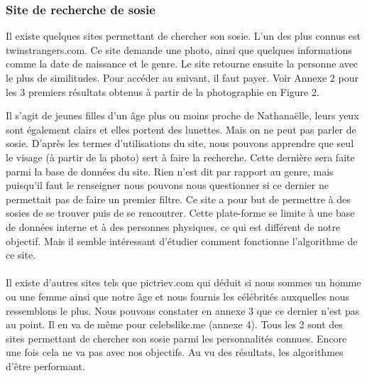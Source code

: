 \documentclass[a4paper,12pt]{article}
\begin{document}
\subsubsection{Site de recherche de sosie}
Il existe quelques sites permettant de chercher son sosie. L'un des plus connus est twinstrangers.com. Ce site demande une photo, ainsi que quelques informations comme la date de naissance et le genre. Le site retourne ensuite la personne avec le plus de similitudes. Pour accéder au suivant, il faut payer. 
Voir Annexe 2 pour les 3 premiers résultats obtenus à partir de la photographie en Figure 2. 
    
Il s'agit de jeunes filles d'un âge plus ou moins proche de Nathanaëlle, leurs yeux sont également clairs et elles portent des lunettes. Mais on ne peut pas parler de sosie. 
D'après les termes d'utilisations du site, nous pouvons apprendre que seul le visage (à partir de la photo) sert à faire la recherche. Cette dernière sera faite parmi la base de données du site. Rien n'est dit par rapport au genre, mais puisqu'il faut le renseigner nous pouvons nous questionner si ce dernier ne permettait pas de faire un premier filtre. Ce site a pour but de permettre à des sosies de se trouver puis de se rencontrer. Cette plate-forme se limite à une base de données interne et à des personnes physiques, ce qui est différent de notre objectif.
Mais il semble intéressant d'étudier comment fonctionne l'algorithme de ce site. 
\\\\
Il existe d'autres sites tels que pictriev.com qui déduit si nous sommes un homme ou une femme ainsi que notre âge et nous fournis les célébrités auxquelles nous ressemblons le plus. Nous pouvons constater en annexe 3 que ce dernier n'est pas au point. Il en va de même pour celebslike.me (annexe 4). Tous les 2 sont des sites permettant de chercher son sosie parmi les personnalités connues. Encore une fois cela ne va pas avec nos objectifs. Au vu des résultats, les algorithmes d'être performant.
\end{document}
